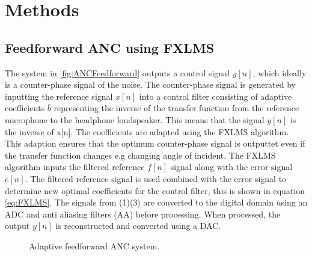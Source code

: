 \section{Methods}
\subsection{Feedforward ANC using FXLMS}


The system in \autoref{fig:ANCFeedforward} outputs a control signal $y[n]$, which ideally is a counter-phase signal of the noise. The counter-phase signal is generated by inputting the reference signal $x[n]$ into a control filter consisting of adaptive coefficients $\bar{b}$ representing the inverse of the transfer function from the reference microphone to the headphone loudspeaker. This means that the signal $y[n]$ is the inverse of x[n]. The coefficients are adapted using the FXLMS algorithm. This adaption ensures that the optimum counter-phase signal is outputtet even if the transfer function changes e.g changing angle of incident. The FXLMS algorithm inputs the filtered reference $f[n]$ signal along with the error signal $e[n]$. The filtered reference signal is used combined with the error signal to determine new optimal coefficients for the control filter, this is shown in equation \ref{eq:FXLMS}. The signals from (1)(3) are converted to the digital domain using an ADC and anti aliasing filters (AA) before processing. When processed, the output $y[n]$ is reconstructed and converted using a DAC.


\begin{figure}[H]
		
	\caption{Adaptive feedforward ANC system.}
	\label{fig:ANCFeedforward}
\end{figure}



